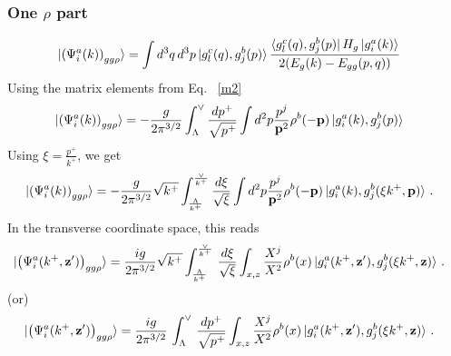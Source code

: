 \documentclass[aps,prd,amsmath,amssymb,nofootinbib]{revtex4-2}
\def\v#1{\mathbf{#1}}
\numberwithin{equation}{section}
\begin{document}
\subsubsection{One $\rho$ part}
\begin{figure}[h]
\end{figure}
\begin{align}
  \ket{ \left(\Psi^{a}_{i}(k) \right)_{gg\rho} }
   & = \int d^{3}q\, d^{3}p 
   \ket{g^{c}_{l}(q),g^{b}_{j}(p)}
 \frac{\bra{g^{c}_{l}(q),g^{b}_{j}(p)}H_{g}\ket{g^{a}_{i}(k)}}{2(E_{g}(k)-E_{gg}(p,q))}
\end{align}
Using the matrix elements from Eq.~ \eqref{m2}
\begin{align}
 \ket{ \left(\Psi^{a}_{i}(k) \right)_{gg\rho} }   & = - \frac{g}{2\pi^{3/2}} \int_{\Lambda}^{\vee} \frac{dp^+}{\sqrt{p^+}}
   \int d^2 p \frac{p^j}{\v{p}^2} \rho^b(-\v{p})
   \ket{g^{a}_{i}(k),g^{b}_{j}(p)}
\end{align}
Using $\xi = \frac{p^{+}}{k^{+}}$, we get
\begin{align}
\ket{ \left(\Psi^{a}_{i}(k) \right)_{gg\rho} }   & = - \frac{g}{2\pi^{3/2}} \sqrt{k^+} \int_{\frac{\Lambda}{k^+} }^{\frac{\vee}{k^+} } \frac{d\xi}{\sqrt{\xi}}
   \int d^2 p \frac{p^j}{\v{p}^2} \rho^b(-\v{p})
   \ket{g^{a}_{i}(k),g^{b}_{j}(\xi k^+,\v{p})}\,.
\end{align}
In the transverse coordinate space, this reads 
\begin{align}
  \notag
  \ket{ \left(\Psi^{a}_{i}(k^+, \v{z}') \right)_{gg\rho} }%
  & = \frac{ig}{2\pi^{3/2}} \sqrt{k^+} \int_{\frac{\Lambda}{k^+} }^{\frac{\vee}{k^+} }\,\frac{d\xi}{\sqrt{\xi}}
   \int_{x,z} \frac{X^j}{X^2} \rho^{b}(x)
   \ket{g^{a}_{i}(k^+,\v{z}'),g^{b}_{j}(\xi k^+,\v{z})}\,.
\end{align}
(or)
\begin{align}%
  \ket{ \left(\Psi^{a}_{i}(k^+, \v{z}') \right)_{gg\rho} }%
  & = \frac{ig}{2\pi^{3/2}}\,\int_{\Lambda}^{\vee}\, \frac{dp^+}{\sqrt{p^+}}
   \int_{x,z} \frac{X^j}{X^2} \rho^{b}(x)
   \ket{g^{a}_{i}(k^+,\v{z}'),g^{b}_{j}(\xi k^+,\v{z})}\,.
\end{align}
\end{document}
